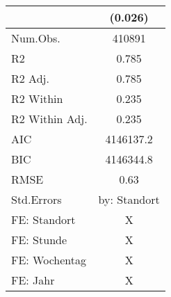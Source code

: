 \begin{table}
\begin{tabular}[t]{lc}
 & (\num{0.026})\\
\midrule
Num.Obs. & \num{410891}\\
R2 & \num{0.785}\\
R2 Adj. & \num{0.785}\\
R2 Within & \num{0.235}\\
R2 Within Adj. & \num{0.235}\\
AIC & \num{4146137.2}\\
BIC & \num{4146344.8}\\
RMSE & \num{0.63}\\
Std.Errors & by: Standort\\
FE: Standort & X\\
FE: Stunde & X\\
FE: Wochentag & X\\
FE: Jahr & X\\
\bottomrule
\end{tabular}
\end{table}
